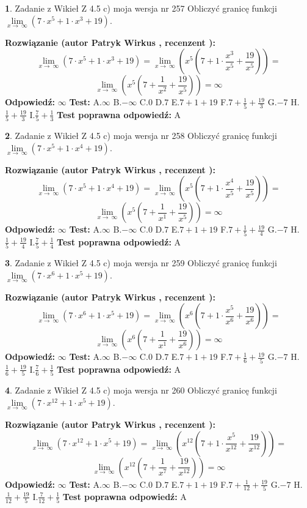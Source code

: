 \documentclass[12pt, a4paper]{article}
\theoremstyle{definition} %
\newtheorem{zad}{}
\newcommand{\zadStart}[1]{\begin{zad}#1\newline}
\newcommand{\zadStop}{\end{zad}}
\newcommand{\rozwStart}[2]{\noindent \textbf{Rozwiązanie (autor #1 , recenzent #2): }\newline}
\newcommand{\rozwStop}{\newline}
\newcommand{\odpStart}{\noindent \textbf{Odpowiedź:}\newline}
\newcommand{\odpStop}{\newline}
\newcommand{\testStart}{\noindent \textbf{Test:}\newline}
\newcommand{\testStop}{\newline}
\newcommand{\kluczStart}{\noindent \textbf{Test poprawna odpowiedź:}\newline}
\newcommand{\kluczStop}{\newline}
\begin{document}
\zadStart{Zadanie z Wikieł Z 4.5 c) moja wersja nr 257}
Obliczyć granicę funkcji  $\lim\limits_{x\to\ \infty}(7 \cdot x^{5}+1 \cdot x^{3}+19)$.
\zadStop
\rozwStart{Patryk Wirkus}{}
$$\lim\limits_{x\to\ \infty}(7 \cdot x^{5}+1 \cdot x^{3}+19) = \lim\limits_{x\to\ \infty}(x^{5}(7 +1 \cdot \frac{x^{3}}{x^{5}}+\frac{19}{x^{5}})) =$$ $$\lim\limits_{x\to\ \infty}(x^{5}(7 +\frac{1}{x^{2}}+\frac{19}{x^{5}})) =\infty$$
\rozwStop
\odpStart
$\infty$
\odpStop
\testStart
A.$\infty$ B.$-\infty$ C.$0$ D.$7$ E.$7 + 1 + 19$
F.$7+\frac{1}{5}+\frac{19}{3}$ G.$-7$
H.$\frac{1}{5}+\frac{19}{3}$
I.$\frac{7}{5}+\frac{1}{3}$
\testStop
\kluczStart
A
\kluczStop



\zadStart{Zadanie z Wikieł Z 4.5 c) moja wersja nr 258}
Obliczyć granicę funkcji  $\lim\limits_{x\to\ \infty}(7 \cdot x^{5}+1 \cdot x^{4}+19)$.
\zadStop
\rozwStart{Patryk Wirkus}{}
$$\lim\limits_{x\to\ \infty}(7 \cdot x^{5}+1 \cdot x^{4}+19) = \lim\limits_{x\to\ \infty}(x^{5}(7 +1 \cdot \frac{x^{4}}{x^{5}}+\frac{19}{x^{5}})) =$$ $$\lim\limits_{x\to\ \infty}(x^{5}(7 +\frac{1}{x^{1}}+\frac{19}{x^{5}})) =\infty$$
\rozwStop
\odpStart
$\infty$
\odpStop
\testStart
A.$\infty$ B.$-\infty$ C.$0$ D.$7$ E.$7 + 1 + 19$
F.$7+\frac{1}{5}+\frac{19}{4}$ G.$-7$
H.$\frac{1}{5}+\frac{19}{4}$
I.$\frac{7}{5}+\frac{1}{4}$
\testStop
\kluczStart
A
\kluczStop



\zadStart{Zadanie z Wikieł Z 4.5 c) moja wersja nr 259}
Obliczyć granicę funkcji  $\lim\limits_{x\to\ \infty}(7 \cdot x^{6}+1 \cdot x^{5}+19)$.
\zadStop
\rozwStart{Patryk Wirkus}{}
$$\lim\limits_{x\to\ \infty}(7 \cdot x^{6}+1 \cdot x^{5}+19) = \lim\limits_{x\to\ \infty}(x^{6}(7 +1 \cdot \frac{x^{5}}{x^{6}}+\frac{19}{x^{6}})) =$$ $$\lim\limits_{x\to\ \infty}(x^{6}(7 +\frac{1}{x^{1}}+\frac{19}{x^{6}})) =\infty$$
\rozwStop
\odpStart
$\infty$
\odpStop
\testStart
A.$\infty$ B.$-\infty$ C.$0$ D.$7$ E.$7 + 1 + 19$
F.$7+\frac{1}{6}+\frac{19}{5}$ G.$-7$
H.$\frac{1}{6}+\frac{19}{5}$
I.$\frac{7}{6}+\frac{1}{5}$
\testStop
\kluczStart
A
\kluczStop



\zadStart{Zadanie z Wikieł Z 4.5 c) moja wersja nr 260}
Obliczyć granicę funkcji  $\lim\limits_{x\to\ \infty}(7 \cdot x^{12}+1 \cdot x^{5}+19)$.
\zadStop
\rozwStart{Patryk Wirkus}{}
$$\lim\limits_{x\to\ \infty}(7 \cdot x^{12}+1 \cdot x^{5}+19) = \lim\limits_{x\to\ \infty}(x^{12}(7 +1 \cdot \frac{x^{5}}{x^{12}}+\frac{19}{x^{12}})) =$$ $$\lim\limits_{x\to\ \infty}(x^{12}(7 +\frac{1}{x^{7}}+\frac{19}{x^{12}})) =\infty$$
\rozwStop
\odpStart
$\infty$
\odpStop
\testStart
A.$\infty$ B.$-\infty$ C.$0$ D.$7$ E.$7 + 1 + 19$
F.$7+\frac{1}{12}+\frac{19}{5}$ G.$-7$
H.$\frac{1}{12}+\frac{19}{5}$
I.$\frac{7}{12}+\frac{1}{5}$
\testStop
\kluczStart
A
\kluczStop
\end{document}

